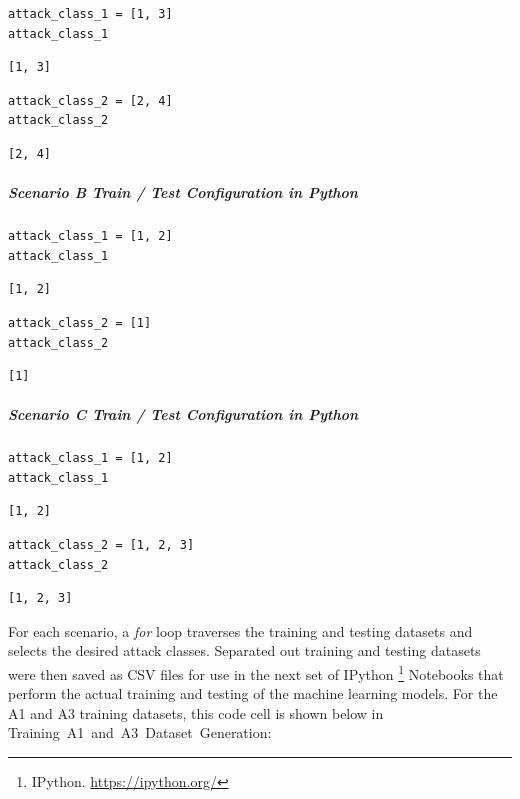 \begin{verbatim}
attack_class_1 = [1, 3]
attack_class_1
\end{verbatim}

\begin{verbatim}
[1, 3]
\end{verbatim}

\begin{verbatim}
attack_class_2 = [2, 4]
attack_class_2
\end{verbatim}

\begin{verbatim}
[2, 4]
\end{verbatim}

\subparagraph{Scenario B Train / Test Configuration in Python}

\begin{verbatim}
attack_class_1 = [1, 2]
attack_class_1
\end{verbatim}

\begin{verbatim}
[1, 2]
\end{verbatim}

\begin{verbatim}
attack_class_2 = [1]
attack_class_2
\end{verbatim}

\begin{verbatim}
[1]
\end{verbatim}

\subparagraph{Scenario C Train / Test Configuration in Python}

\begin{verbatim}
attack_class_1 = [1, 2]
attack_class_1
\end{verbatim}

\begin{verbatim}
[1, 2]
\end{verbatim}

\begin{verbatim}
attack_class_2 = [1, 2, 3]
attack_class_2
\end{verbatim}

\begin{verbatim}
[1, 2, 3]
\end{verbatim}

For each scenario, a \textit{for} loop traverses the training and testing datasets and selects the desired attack classes.  Separated out training and testing datasets were then saved as CSV files for use in the next set of IPython \footnote{IPython. \href{https://ipython.org/}{https://ipython.org/}} Notebooks that perform the actual training and testing of the machine learning models.  For the A1 and A3 training datasets, this code cell is shown below in Training~A1~and~A3~Dataset~Generation:

